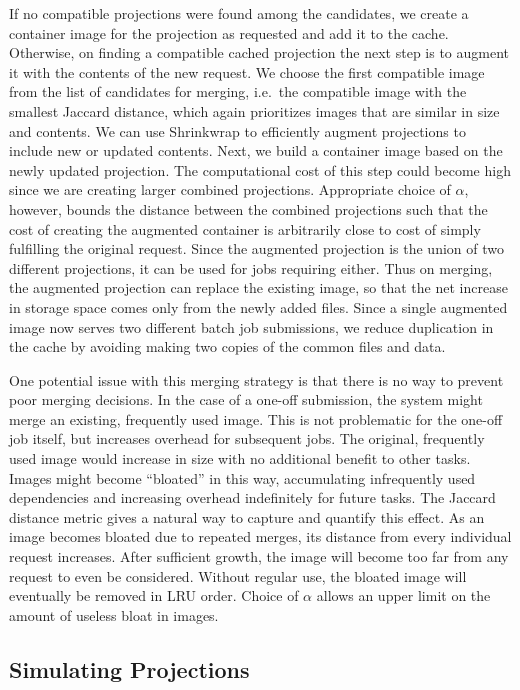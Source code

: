 \documentclass[sigconf]{acmart}
\begin{document}
If no compatible projections were found among the candidates,
we create a container image for the projection as requested and add it to the cache.
Otherwise, on finding a compatible cached projection the next step is to augment it with the contents of the new request.
We choose the first compatible image from the list of candidates for merging,
i.e.\ the compatible image with the smallest Jaccard distance,
which again prioritizes images that are similar in size and contents.
We can use Shrinkwrap to efficiently augment projections to include new or updated contents.
Next, we build a container image based on the newly updated projection.
The computational cost of this step could become high since we are creating larger combined projections.
Appropriate choice of $\alpha$, however,
bounds the distance between the combined projections such that the cost of creating the augmented container is arbitrarily close to cost of simply fulfilling the original request.
Since the augmented projection is the union of two different projections,
it can be used for jobs requiring either.
Thus on merging, the augmented projection can replace the existing image,
so that the net increase in storage space comes only from the newly added files.
Since a single augmented image now serves two different batch job submissions,
we reduce duplication in the cache by avoiding making two copies of the common files and data.

One potential issue with this merging strategy is that there is no way to prevent poor merging decisions.
In the case of a one-off submission,
the system might merge an existing, frequently used image.
This is not problematic for the one-off job itself,
but increases overhead for subsequent jobs.
The original, frequently used image would increase in size with no additional benefit to other tasks.
Images might become ``bloated'' in this way,
accumulating infrequently used dependencies and increasing overhead indefinitely for future tasks.
The Jaccard distance metric gives a natural way to capture and quantify this effect.
As an image becomes bloated due to repeated merges,
its distance from every individual request increases.
After sufficient growth,
the image will become too far from any request to even be considered.
Without regular use,
the bloated image will eventually be removed in LRU order.
Choice of $\alpha$ allows an upper limit on the amount of useless bloat in images.   

\subsection{Simulating Projections}
\end{document}
